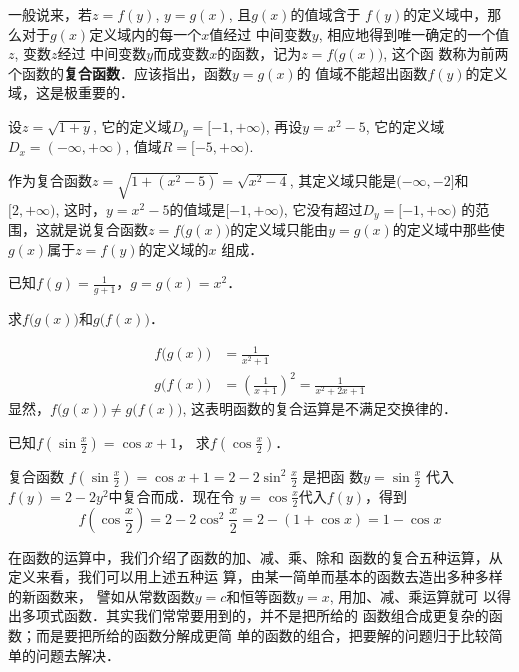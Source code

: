 一般说来，若$z=f(y)$, $y=g(x)$, 且$g(x)$的值域含于
$f(y)$的定义域中，那么对于$g(x)$定义域内的每一个$x$值经过
中间变数$y$, 相应地得到唯一确定的一个值$z$, 变数$z$经过
中间变数$y$而成变数$x$的函数，记为$z=f\big(g(x)\big)$, 这个函
数称为前两个函数的\textbf{复合函数}．应该指出，函数$y=g(x)$的
值域不能超出函数$f(y)$的定义域，这是极重要的．


\begin{example}
    设$z=\sqrt{1+y}$, 它的定义域$D_y=[-1,+\infty)$,
再设$y=x^2-5$, 它的定义域$D_x=(-\infty,+\infty)$, 值域$R=
[-5,+\infty)$. 

作为复合函数$z=\sqrt{1+(x^2-5)}=\sqrt{x^2-4}$,
其定义域只能是$(-\infty,-2]$和$[2,+\infty)$, 这时，$y=x^2-
5$的值域是$[-1,+\infty)$, 它没有超过$D_y=[-1,+\infty)$
的范围，这就是说复合函数$z=f\big(g(x)\big)$的定义域只能由$y=
g(x)$的定义域中那些使$g(x)$属于$z=f(y)$的定义域的$x$
组成．
\end{example}

\begin{example}
已知$f(g)=\frac{1}{g+1}$，$g=g(x)=x^2$．

求$f\big(g(x)\big)$和$g\big(f(x)\big)$．    
\end{example}

\begin{solution}
\[\begin{split}
    f\big(g(x)\big)&=\frac{1}{x^2+1}\\
    g\big(f(x)\big)&=\left(\frac{1}{x+1}\right)^2=\frac{1}{x^2+2x+1}
\end{split}\]
显然，$f\big(g(x)\big)\ne g\big(f(x)\big)$, 这表明函数的复合运算是不满足交换律的．
\end{solution}

\begin{example}
已知$f\left(\sin\frac{x}{2}\right)=\cos x+1$，
求$f\left(\cos\frac{x}{2}\right)$．
\end{example}    

\begin{solution}
    复合函数
$f\left(\sin\frac{x}{2}\right)=\cos x+1=2-2\sin^2\frac{x}{2}$
    是把函
    数$y=\sin\frac{x}{2}$
    代入$f(y)=2-2y^2$中复合而成．现在令
    $y=\cos\frac{x}{2}$代入$f(y)$，得到
\[f\left(\cos\frac{x}{2}\right)=2-2\cos^2\frac{x}{2}=2-(1+\cos x)=1-\cos x\]
\end{solution}    

在函数的运算中，我们介绍了函数的加、减、乘、除和
函数的复合五种运算，从定义来看，我们可以用上述五种运
算，由某一简单而基本的函数去造出多种多样的新函数来，
譬如从常数函数$y=c$和恒等函数$y=x$, 用加、减、乘运算就可
以得出多项式函数．其实我们常常要用到的，并不是把所给的
函数组合成更复杂的函数；而是要把所给的函数分解成更简
单的函数的组合，把要解的问题归于比较简单的问题去解决．


